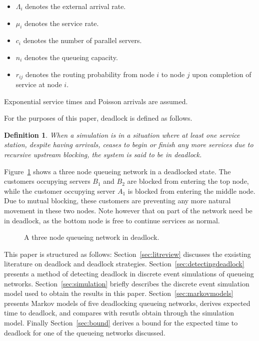 \documentclass{article}
\newtheorem{definition}{Definition}
\begin{document}
\begin{itemize}
	\item $\Lambda_i$ denotes the external arrival rate.
	\item $\mu_i$ denotes the service rate.
	\item $c_i$ denotes the number of parallel servers.
	\item $n_i$ denotes the queueing capacity.
	\item $r_{ij}$ denotes the routing probability from node $i$ to node $j$ upon completion of service at node $i$.
\end{itemize}

Exponential service times and Poisson arrivals are assumed.

For the purposes of this paper, deadlock is defined as follows.\\

\begin{definition}
    When a simulation is in a situation where at least one service station,
    despite having arrivals, ceases to begin or finish any more services
    due to recursive upstream blocking, the system is said to be in deadlock.
\end{definition}

Figure~\ref{fig:firstexample} shows a three node queueing network in a deadlocked state.
The customers occupying servers $B_1$ and $B_2$ are blocked from entering the top node, while the customer occupying server $A_1$ is blocked from entering the middle node.
Due to mutual blocking, these customers are preventing any more natural movement in these two nodes.
Note however that on part of the network need be in deadlock, as the bottom node is free to continue services as normal.

\begin{figure}[!htbp]
  \begin{center}
  
  \caption{A three node queueing network in deadlock.}
  \label{fig:firstexample}
  \end{center}
\end{figure}

This paper is structured as follows: Section~\ref{sec:litreview} discusses the exsisting literature on deadlock and deadlock strategies. Section~\ref{sec:detectingdeadlock} presents a method of detecting deadlock in discrete event simulations of queueing networks. Section~\ref{sec:simulation} briefly describes the discrete event simulation model used to obtain the results in this paper. Section~\ref{sec:markovmodels} presents Markov models of five deadlocking queueing networks, derives expected time to deadlock, and compares with resutls obtain through the simulation model. Finally Section~\ref{sec:bound} derives a bound for the expected time to deadlock for one of the queueing networks discussed.
\end{document}
